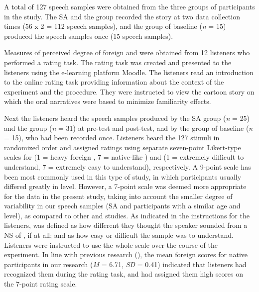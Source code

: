 \documentclass[output=paper]{langsci/langscibook}
\begin{document}
A total of 127 speech samples were obtained from the three groups of participants in the study. The SA  and the  group  recorded the story at two data collection times (56 x 2 = 112 speech samples), and the group of baseline  (\textit{n} = 15) produced the speech samples once (15 speech samples).

Measures of perceived degree of foreign  and  were obtained from 12 listeners who performed a rating task. The rating task was created and presented to the listeners using the e-learning platform Moodle. The listeners read an introduction to the online rating task providing information about the context of the experiment and the procedure. They were instructed to view the cartoon story on which the oral narratives were based to minimize familiarity effects. 

Next the listeners heard the speech samples produced by the SA group (\textit{n} = 25) and the  group (\textit{n} = 31) at pre-test and post-test, and by the group of baseline  (\textit{n} = 15), who had been recorded once. Listeners heard the 127 stimuli in randomized order and assigned ratings using separate seven-point Likert-type scales for  (1 = heavy foreign , 7 = native-like ) and  (1 = extremely difficult to understand, 7 = extremely easy to understand), respectively. A 9-point scale has been most commonly used in this type of study, in which participants usually differed greatly in  level. However, a 7-point scale was deemed more appropriate for the data in the present study, taking into account the smaller degree of variability in our speech samples (SA and  participants with a similar age and  level), as compared to other  and  studies. As indicated in the instructions for the listeners,  was defined as how different they thought the speaker sounded from a NS of , if at all; and  as how easy or difficult the sample was to understand. Listeners were instructed to use the whole scale over the course of the experiment. In line with previous research (\citealt{DerwingMunro2013}), the mean foreign  scores for native participants in our research (\textit{M} = 6.71, \textit{SD} = 0.41) indicated that listeners had recognized them during the rating task, and had assigned them high scores on the 7-point rating scale. 
\end{document}
